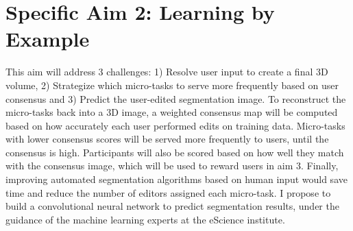 
\section{Specific Aim 2: Learning by Example}
This aim will address 3 challenges: 1) Resolve user input to create a final 3D volume, 2) Strategize which micro-tasks to serve more frequently based on user consensus and 3) Predict the user-edited segmentation image. To reconstruct the micro-tasks back into a 3D image, a weighted consensus map will be computed based on how accurately each user performed edits on training data. Micro-tasks with lower consensus scores will be served more frequently to users, until the consensus is high. Participants will also be scored based on how well they match with the consensus image, which will be used to reward users in aim 3. Finally, improving automated segmentation algorithms based on human input would save time and reduce the number of editors assigned each micro-task. I propose to build a convolutional neural network to predict segmentation results, under the guidance of the machine learning experts at the eScience institute. 

